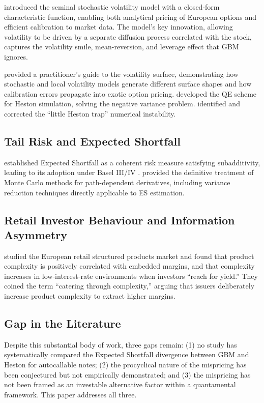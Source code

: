 \documentclass[12pt,a4paper]{article}
\begin{document}
\citet{heston1993} introduced the seminal stochastic volatility model with a closed-form characteristic function, enabling both analytical pricing of European options and efficient calibration to market data. The model's key innovation, allowing volatility to be driven by a separate diffusion process correlated with the stock, captures the volatility smile, mean-reversion, and leverage effect that GBM ignores.

\citet{gatheral2006} provided a practitioner's guide to the volatility surface, demonstrating how stochastic and local volatility models generate different surface shapes and how calibration errors propagate into exotic option pricing. \citet{andersen2008} developed the QE scheme for Heston simulation, solving the negative variance problem. \citet{albrecher2007} identified and corrected the ``little Heston trap'' numerical instability.

\subsection{Tail Risk and Expected Shortfall}

\citet{acerbi2002} established Expected Shortfall as a coherent risk measure satisfying subadditivity, leading to its adoption under Basel III/IV \citep{bcbs2019}. \citet{glasserman2003} provided the definitive treatment of Monte Carlo methods for path-dependent derivatives, including variance reduction techniques directly applicable to ES estimation.

\subsection{Retail Investor Behaviour and Information Asymmetry}

\citet{celerier2017} studied the European retail structured products market and found that product complexity is positively correlated with embedded margins, and that complexity increases in low-interest-rate environments when investors ``reach for yield.'' They coined the term ``catering through complexity,'' arguing that issuers deliberately increase product complexity to extract higher margins.

\subsection{Gap in the Literature}

Despite this substantial body of work, three gaps remain: (1) no study has systematically compared the Expected Shortfall divergence between GBM and Heston for autocallable notes; (2) the procyclical nature of the mispricing has been conjectured but not empirically demonstrated; and (3) the mispricing has not been framed as an investable alternative factor within a quantamental framework. This paper addresses all three.
\end{document}
